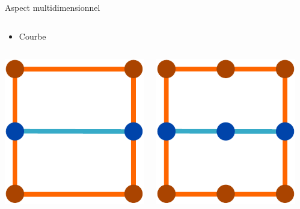 \documentclass[xcolor=x11names,compress]{beamer}
\renewcommand{\(}{\begin{columns}} \renewcommand{\)}{\end{columns}}
\newcommand{\<}[1]{\begin{column}{#1}} \renewcommand{\>}{\end{column}}
\begin{document}
\begin{frame}{Aspect multidimensionnel}
\begin{columns}[t]
\begin{column}{0.3\textwidth}
    \end{column}
  \end{columns}
  \begin{itemize}
    \item Courbe
  \end{itemize}
  \begin{columns}[t]
    \begin{column}{0.3\textwidth}
      \centering
      \includegraphics[scale=0.4]{OutilCourbe4}
    \end{column}
    \begin{column}{0.3\textwidth}
      \centering
      \includegraphics[scale=0.4]{OutilCourbe6}
    \end{column}
    \begin{column}{0.3\textwidth}
      \centering

\end{column}
\end{columns}
\end{frame}
\end{document}
